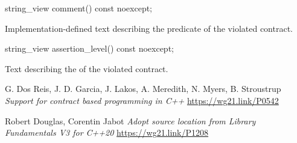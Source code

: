 \documentclass{wg21}
\begin{document}
%
\begin{itemdecl}
	string_view comment() const noexcept;
\end{itemdecl}

\begin{itemdescr}
	\pnum
	\returns Implementation-defined text describing
	the predicate of the violated contract.
\end{itemdescr}

%
\begin{itemdecl}
	string_view assertion_level() const noexcept;
\end{itemdecl}

\begin{itemdescr}
	\pnum
	\returns Text describing the 
	of the violated contract.
\end{itemdescr}


\begin{thebibliography}{9}
	
	G. Dos Reis, J. D. Garcia, J. Lakos, A. Meredith, N. Myers, B. Stroustrup
	\emph{Support for contract based programming in C++}
	\url{https://wg21.link/P0542}
	
	Robert Douglas, Corentin Jabot
	\emph{Adopt source location from Library Fundamentals V3 for C++20}
	\url{https://wg21.link/P1208}		
	
\end{thebibliography}
\end{document}
